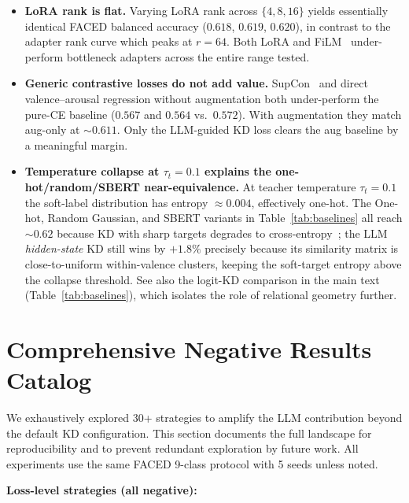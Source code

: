 \begin{itemize}
    \item \textbf{LoRA rank is flat.} Varying LoRA rank across $\{4, 8, 16\}$ yields essentially identical FACED balanced accuracy ($0.618$, $0.619$, $0.620$), in contrast to the adapter rank curve which peaks at $r = 64$. Both LoRA and FiLM~\cite{perez2018film} under-perform bottleneck adapters across the entire range tested.
    \item \textbf{Generic contrastive losses do not add value.} SupCon~\cite{khosla2020supcon} and direct valence--arousal regression without augmentation both under-perform the pure-CE baseline ($0.567$ and $0.564$ vs.\ $0.572$). With augmentation they match aug-only at $\sim$$0.611$. Only the LLM-guided KD loss clears the aug baseline by a meaningful margin.
    \item \textbf{Temperature collapse at $\tau_t = 0.1$ explains the one-hot/random/SBERT near-equivalence.} At teacher temperature $\tau_t = 0.1$ the soft-label distribution has entropy $\approx 0.004$, effectively one-hot. The One-hot, Random Gaussian, and SBERT variants in Table~\ref{tab:baselines} all reach $\sim$$0.62$ because KD with sharp targets degrades to cross-entropy~\cite{vitkd2022}; the LLM \emph{hidden-state} KD still wins by $+1.8\%$ precisely because its similarity matrix is close-to-uniform within-valence clusters, keeping the soft-target entropy above the collapse threshold. See also the logit-KD comparison in the main text (Table~\ref{tab:baselines}), which isolates the role of relational geometry further.
\end{itemize}

\section{Comprehensive Negative Results Catalog}
\label{sec:supp_negative}

We exhaustively explored 30+ strategies to amplify the LLM contribution beyond the default KD configuration. This section documents the full landscape for reproducibility and to prevent redundant exploration by future work. All experiments use the same FACED 9-class protocol with 5 seeds unless noted.

\noindent\textbf{Loss-level strategies (all negative):}

